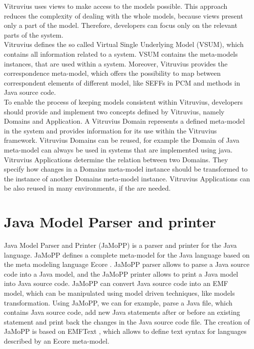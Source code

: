 Vitruvius uses views to make access to the models possible. This approach reduces the complexity of dealing with the whole models, because views present only a part of the model. Therefore, developers can focus only on the relevant parts of the system.\\

Vitruvius defines the so called Virtual Single Underlying Model (VSUM), which contains all information related to a system. VSUM contains the meta-models instances, that are used within a system. Moreover, Vitruvius provides the correspondence meta-model, which offers the possibility to map between correspondent elements of different model, like SEFFs in PCM and methods in Java source code. \\ 

To enable the process of keeping models consistent within Vitruvius, developers should provide and implement two concepts defined by Vitruvius, namely Domains and Application. A Vitruvius Domain represents a defined meta-model in the system and provides information for its use within the Vitruvius framework. Vitruvius Domains can be reused, for example the Domain of Java meta-model can always be used in systems that are implemented using java. Vitruvius Applications determine the relation between two Domains. They specify how changes in a Domains meta-model instance should be transformed to the instance of another Domains meta-model instance. Vitruvius Applications can be also reused in many environments, if the are needed. 

\section{Java Model Parser and printer}
\label{sec:Java Model Parser and printer}

Java Model Parser and Printer (JaMoPP) \cite{heidenreich2009closing} is a parser and printer for the Java language. JaMoPP defines a complete meta-model for the Java language based on the meta modeling language Ecore \cite{steinberg2008emf}. JaMoPP parser allows to parse a Java source code into a Java model, and the JaMoPP printer allows to print a Java model into Java source code. JaMoPP can convert Java source code into an EMF model, which can be manipulated using model driven techniques, like models transformation. Using JaMoPP, we can for example, parse a Java file, which contains Java source code, add new Java statements after or before an existing statement and print back the changes in the Java source code file. The creation of JaMoPP is based on EMFText \cite{heidenreich2009derivation}, which allows to define text syntax for languages described by an Ecore meta-model. \\

